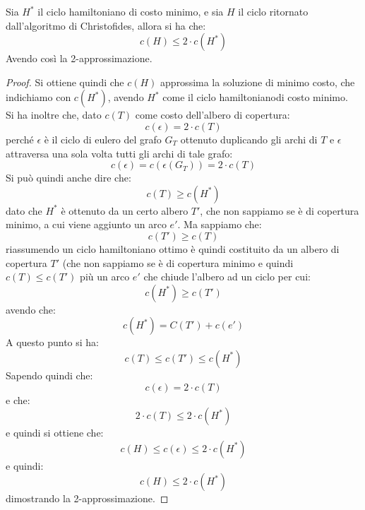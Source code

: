 																      	\begin{definizione}
																      		Sia $H^*$ il ciclo hamiltoniano di costo minimo, e sia $H$ il ciclo ritornato
																      		dall’algoritmo di Christofides, allora si ha che:
																      		\[c(H)\leq 2\cdot c(H^*)\]
																      		Avendo così la 2-approssimazione.
																      	\end{definizione}
																      	\begin{proof}
																      		Si ottiene quindi che $c(H)$ approssima la soluzione di minimo costo, che
																      		indichiamo con $c(H^*)$, avendo $H^*$ come il ciclo hamiltonianodi costo
																      		minimo. \\
																      		Si ha inoltre che, dato $c(T)$ come costo dell'albero di copertura:
																      		\[c(\epsilon)=2\cdot c(T)\]
																      		perché $\epsilon$ è il ciclo di eulero del grafo $G_T$ ottenuto duplicando gli
																      		archi di $T$ e $\epsilon$ attraversa una sola volta tutti gli archi di tale
																      		grafo:
																      		\[c(\epsilon)=c(\epsilon(G_T))=2\cdot c(T)\]
																      		Si può quindi anche dire che:
																      		\[c(T)\geq c(H^*)\]
																      		dato che $H^*$ è ottenuto da un certo albero $T'$, che non sappiamo se è di
																      		copertura minimo, a cui viene aggiunto un arco $e'$.
																      		Ma sappiamo che:
																      		\[c(T')\geq c(T)\]
																      		riassumendo un ciclo hamiltoniano ottimo è quindi costituito da un albero di
																      		copertura $T'$ (che non sappiamo se è di copertura minimo e quindi $c(T)\leq
																      		c(T')$ più un arco $e'$ che chiude l'albero ad un ciclo per cui: 
																      		\[c(H^*)\geq c(T')\]
																      		avendo che:
																      		\[c(H^*)=C(T')+c(e')\]
																      		A questo punto si ha:
																      		\[c(T)\leq c(T')\leq c(H^*)\]
																      		Sapendo quindi che:
																      		\[c(\epsilon)=2\cdot c(T)\]
																      		e che:
																      		\[2\cdot c(T)\leq 2\cdot c(H^*)\]
																      		e quindi si ottiene che:
																      		\[c(H)\leq c(\epsilon)\leq 2\cdot c(H^*)\]
																      		e quindi:
																      		\[c(H)\leq 2\cdot c(H^*)\]
																      		dimostrando la 2-approssimazione.
																      	\end{proof}
																      																	      	
